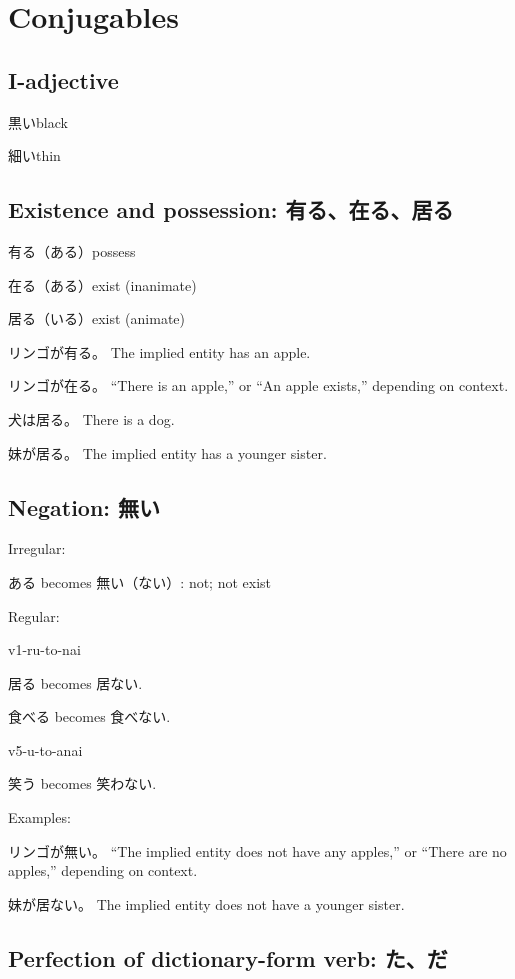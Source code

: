 \chapter{Conjugables}

\section{I-adjective}

黒いblack

細いthin

\section{Existence and possession: 有る、在る、居る}

有る（ある）possess

在る（ある）exist (inanimate)

居る（いる）exist (animate)

リンゴが有る。
The implied entity has an apple.

リンゴが在る。
``There is an apple,''
or ``An apple exists,''
depending on context.

犬は居る。
There is a dog.

妹が居る。
The implied entity has a younger sister.

\section{Negation: 無い}

Irregular:

ある becomes 無い（ない）: not; not exist

Regular:

v1-ru-to-nai

居る becomes 居ない.

食べる becomes 食べない.

v5-u-to-anai

笑う becomes 笑わない.

Examples:

リンゴが無い。
``The implied entity does not have any apples,''
or ``There are no apples,''
depending on context.

妹が居ない。
The implied entity does not have a younger sister.

\section{Perfection of dictionary-form verb: た、だ}

